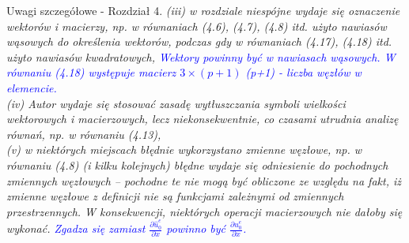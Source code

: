 \documentclass[10pt,aspectratio=169]{beamer} %
\begin{document}
\begin{frame}[label=frame4]{Uwagi szczegółowe - Rozdział 4.}\justifying
\textit{(iii) w rozdziale niespójne wydaje się oznaczenie wektorów i macierzy, np. w równaniach (4.6), (4.7), (4.8) itd. użyto nawiasów wąsowych do określenia wektorów, podczas gdy w równaniach (4.17), (4.18) itd. użyto nawiasów kwadratowych, \textcolor{blue}{Wektory powinny być w nawiasach wąsowych. W równaniu (4.18) występuje macierz \(3\times(p+1)\) (p+1) - liczba węzłów w elemencie.} \\
(iv) Autor wydaje się stosować zasadę wytłuszczania symboli wielkości wektorowych i macierzowych, lecz niekonsekwentnie, co czasami utrudnia analizę równań, np. w równaniu (4.13),}\\
\textit{(v) w niektórych miejscach błędnie wykorzystano zmienne węzłowe, np. w równaniu (4.8) (i kilku kolejnych) błędne wydaje się odniesienie do pochodnych zmiennych węzłowych – pochodne te nie mogą być obliczone ze względu na fakt, iż zmienne węzłowe z definicji nie są funkcjami zależnymi od zmiennych przestrzennych. W konsekwencji, niektórych operacji macierzowych nie dałoby się wykonać. \textcolor{blue}{Zgadza się zamiast \(	\frac{\partial \widehat{{u}}_0^e}{\partial x}\) powinno być 	\(\frac{\partial{{u}}_0^e}{\partial x}\).}}
\end{frame}
\end{document}
